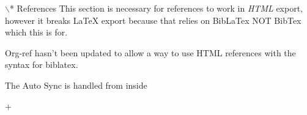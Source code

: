 \documentclass[11pt]{article}
\begin{document}
$\backslash$* References
This section is necessary for references to work in \emph{HTML} export, however it breaks \LaTeX{} export because that relies on BibLaTex NOT BibTex which this is for.

Org-ref hasn't been updated to allow a way to use HTML references with the syntax for biblatex.

The Auto Sync is handled from inside

+\label{org3b2015f}


\label{org5fa8bcd}

\end{document}
